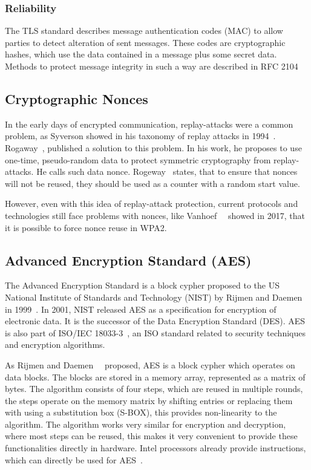 \subsubsection{Reliability}

The TLS standard describes message authentication codes (MAC) to allow parties
to detect alteration of sent messages. These codes are cryptographic hashes,
which use the data contained in a message plus some secret data. Methods to
protect message integrity in such a way are described in RFC 2104~\cite{rfc2104}

\subsection{Cryptographic Nonces}

In the early days of encrypted communication, replay-attacks were a common
problem, as Syverson showed in his taxonomy of replay attacks in
1994~\cite{replaytax}. Rogaway~\cite{nonceintro, nonceassoc}, published a
solution to this problem. In his work, he proposes to use one-time,
pseudo-random data to protect symmetric cryptography from replay-attacks. He
calls such data nonce. Rogeway~\cite{nonceassoc} states, that to ensure that
nonces will not be reused, they should be used as a counter with a random start
value.

However, even with this idea of replay-attack protection, current
protocols and technologies still face problems with nonces, like
Vanhoef~\etal~\cite{wpanoncereuse} showed in 2017, that it is possible to force
nonce reuse in WPA2.

\subsection{Advanced Encryption Standard (AES)}

The Advanced Encryption Standard is a block cypher proposed to the US National
Institute of Standards and Technology (NIST) by Rijmen and Daemen in
1999~\cite{aesproposal}. In 2001, NIST released AES as a specification for
encryption of electronic data. It is the successor of the Data Encryption
Standard (DES). AES is also part of ISO/IEC 18033-3~\cite{iso18033}, an ISO
standard related to security techniques and encryption algorithms.

As Rijmen and Daemen~\etal~\cite{aesproposal} proposed, AES is a block cypher
which operates on data blocks. The blocks are stored in a memory array,
represented as a matrix of bytes. The algorithm consists of four steps, which
are reused in multiple rounds, the steps operate on the memory matrix by
shifting entries or replacing them with using a substitution box (S-BOX), this
provides non-linearity to the algorithm. The algorithm works very similar for
encryption and decryption, where most steps can be reused, this makes it very
convenient to provide these functionalities directly in hardware. Intel
processors already provide instructions, which can directly be used for
AES~\cite{intelaes}.


